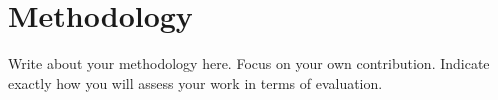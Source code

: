 \section{Methodology}
\label{sec:methodology}
Write about your methodology here. Focus on your own contribution. Indicate exactly how you will assess your work in terms of evaluation.